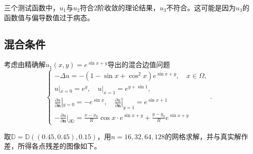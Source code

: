 \documentclass[lang=cn,11pt,a4paper]{elegantpaper}
\begin{document}
三个测试函数中，$u_1$与$u_2$符合2阶收敛的理论结果，$u_3$不符合。这可能是因为$u_3$的函数值与偏导数值过于病态。

\subsection{混合条件}

考虑由精确解$u_1(x,y)=e^{\sin x+y}$导出的混合边值问题
\begin{equation}
  \left\{
    \begin{array}{l}
      -\Delta u = -(1-\sin x+\cos^2 x)e^{\sin x + y},\quad x\in\Omega, \\
      u|_{x=0}=e^{y},\quad u|_{x=1}=e^{y+\sin 1},\\
      \frac{\partial u}{\partial \mathbf{n}}|_{y=0}=-e^{\sin x}, \quad \frac{\partial u}{\partial \mathbf{n}}|_{y=1}=e^{\sin x+1}\\
      -\frac{\partial u}{\partial \mathbf{n}}|_{\partial \mathbb{D}}=\frac{x-x_0}{R}\cos x\cdot e^{\sin x+y}+\frac{y-y_0}{R}e^{\sin x+y}
    \end{array}
  \right. .
\end{equation}

取$\mathbb{D}=\mathbb{D}((0.45,0.45),0.15)$，用$n=16,32,64,128$的网格求解，并与真实解作差，所得各点残差的图像如下。
\end{document}
